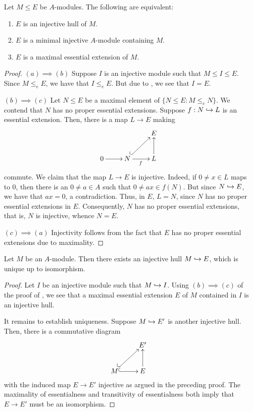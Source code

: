 \begin{theorem}
    Let $M\le E$ be $A$-modules. The following are equivalent: 
    \begin{enumerate}[label=(\alph*)]
        \item $E$ is an injective hull of $M$. 
        \item $E$ is a minimal injective $A$-module containing $M$. 
        \item $E$ is a maximal essential extension of $M$.
    \end{enumerate}
\end{theorem}
\begin{proof}
    $(a)\implies(b)$ Suppose $I$ is an injective module such that $M\le I\le E$. Since $M\le_e E$, we have that $I\le_e E$. But due to , we see that $I = E$.

    $(b)\implies(c)$ Let $N\le E$ be a maximal element of $\{N\le E\colon M\le_e N\}$. We contend that $N$ has no proper essential extensions. Suppose $f: N\hookrightarrow L$ is an essential extension. Then, there is a map $L\to E$ making 
    \begin{equation*}
        \xymatrix {
            & & E\\
            0\ar[r] & N\ar@{^(->}[ru]\ar[r]_f & L\ar[u]
        }
    \end{equation*}
    commute. We claim that the map $L\to E$ is injective. Indeed, if $0\ne x\in L$ maps to $0$, then there is an $0\ne a\in A$ such that $0\ne ax\in f(N)$. But since $N\hookrightarrow E$, we have that $ax = 0$, a contradiction. Thus, in $E$, $L = N$, since $N$ has no proper essential extensions in $E$. Consequently, $N$ has no proper essential extensions, that is, $N$ is injective, whence $N = E$. 

    $(c)\implies(a)$ Injectivity follows from the fact that $E$ has no proper essential extensions due to maximality.
\end{proof}

\begin{theorem}
    Let $M$ be an $A$-module. Then there exists an injective hull $M\hookrightarrow E$, which is unique up to isomorphism.
\end{theorem}
\begin{proof}
    Let $I$ be an injective module such that $M\hookrightarrow I$. Using $(b)\implies(c)$ of the proof of , we see that a maximal essential extension $E$ of $M$ contained in $I$ is an injective hull. 

    It remains to establish uniqueness. Suppose $M\hookrightarrow E'$ is another injective hull. Then, there is a commutative diagram 
    \begin{equation*}
        \xymatrix {
             & E'\\
            M\ar@{^(->}[r]\ar@{^(->}[ru] & E\ar[u]
        }
    \end{equation*}
    with the induced map $E\to E'$ injective as argued in the preceding proof. The maximality of essentialness and transitivity of essentialness both imply that $E\to E'$ must be an isomorphism.
\end{proof}


